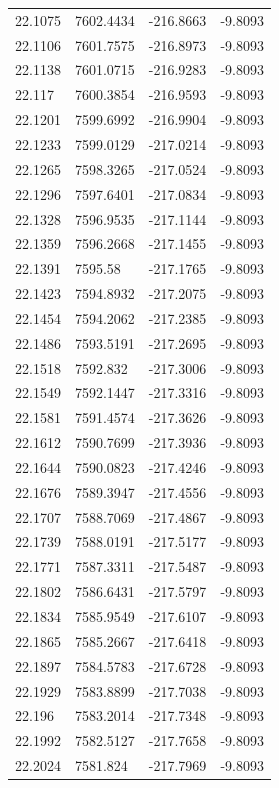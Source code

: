 \begin{table}[H]
\begin{tabular}{llll}
22.1075 & 7602.4434 & -216.8663 & -9.8093 \\
22.1106 & 7601.7575 & -216.8973 & -9.8093 \\
22.1138 & 7601.0715 & -216.9283 & -9.8093 \\
22.117 & 7600.3854 & -216.9593 & -9.8093 \\
22.1201 & 7599.6992 & -216.9904 & -9.8093 \\
22.1233 & 7599.0129 & -217.0214 & -9.8093 \\
22.1265 & 7598.3265 & -217.0524 & -9.8093 \\
22.1296 & 7597.6401 & -217.0834 & -9.8093 \\
22.1328 & 7596.9535 & -217.1144 & -9.8093 \\
22.1359 & 7596.2668 & -217.1455 & -9.8093 \\
22.1391 & 7595.58 & -217.1765 & -9.8093 \\
22.1423 & 7594.8932 & -217.2075 & -9.8093 \\
22.1454 & 7594.2062 & -217.2385 & -9.8093 \\
22.1486 & 7593.5191 & -217.2695 & -9.8093 \\
22.1518 & 7592.832 & -217.3006 & -9.8093 \\
22.1549 & 7592.1447 & -217.3316 & -9.8093 \\
22.1581 & 7591.4574 & -217.3626 & -9.8093 \\
22.1612 & 7590.7699 & -217.3936 & -9.8093 \\
22.1644 & 7590.0823 & -217.4246 & -9.8093 \\
22.1676 & 7589.3947 & -217.4556 & -9.8093 \\
22.1707 & 7588.7069 & -217.4867 & -9.8093 \\
22.1739 & 7588.0191 & -217.5177 & -9.8093 \\
22.1771 & 7587.3311 & -217.5487 & -9.8093 \\
22.1802 & 7586.6431 & -217.5797 & -9.8093 \\
22.1834 & 7585.9549 & -217.6107 & -9.8093 \\
22.1865 & 7585.2667 & -217.6418 & -9.8093 \\
22.1897 & 7584.5783 & -217.6728 & -9.8093 \\
22.1929 & 7583.8899 & -217.7038 & -9.8093 \\
22.196 & 7583.2014 & -217.7348 & -9.8093 \\
22.1992 & 7582.5127 & -217.7658 & -9.8093 \\
22.2024 & 7581.824 & -217.7969 & -9.8093 \\

\end{tabular}
\end{table}

